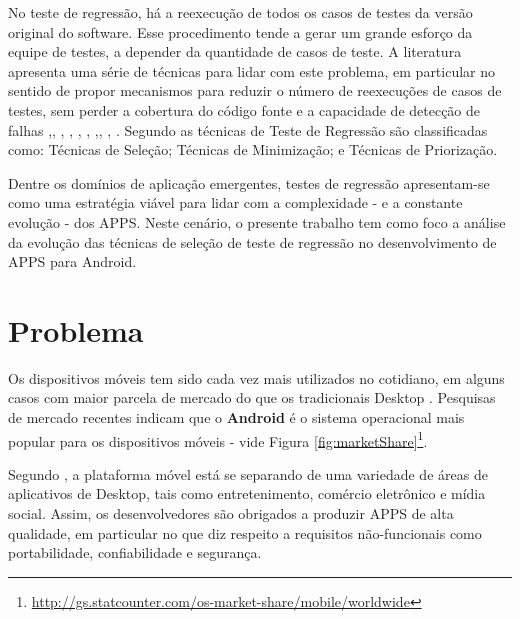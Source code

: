 No teste de regressão, há a reexecução de todos os casos de testes da versão original do software. Esse procedimento tende a gerar um grande esforço da equipe de testes, a depender da quantidade de casos de teste. A literatura apresenta uma série de técnicas para lidar com este problema, em particular no sentido de propor mecanismos para reduzir o número de reexecuções de casos de testes, sem perder a cobertura do código fonte e a capacidade de detecção de falhas ,\cite{65194}, \cite{WHITE1991}, \cite{Graves:2001:ESR:367008.367020}, \cite{630875}, \cite{536955}, \cite{ENGSTROM201014},\cite{ENGSTROM201014}, \cite{KAZMI2017}, \cite{ROMANO201862}. Segundo  as técnicas de Teste de Regressão são classificadas como: Técnicas de Seleção; Técnicas de Minimização; e Técnicas de Priorização.  

Dentre os domínios de aplicação emergentes, testes de regressão apresentam-se como uma estratégia viável para lidar com a complexidade - e a constante evolução - dos \ac{APPS}. Neste cenário, o presente trabalho tem como foco a análise da evolução das técnicas de seleção de teste de regressão no desenvolvimento de \ac{APPS} para Android.


\section{Problema}\label{sec:problema}

Os dispositivos móveis tem sido cada vez mais utilizados no cotidiano, em alguns casos com maior parcela de mercado do que os tradicionais Desktop \cite{Do2016RedroidAR}. Pesquisas de mercado recentes indicam que o \textbf{Android} é o sistema operacional mais popular para os dispositivos móveis - vide Figura \ref{fig:marketShare}\footnote{\url{http://gs.statcounter.com/os-market-share/mobile/worldwide}}. 

Segundo , a plataforma móvel está se separando de uma variedade de áreas de aplicativos de Desktop, tais como entretenimento, comércio eletrônico e mídia social. Assim, os desenvolvedores são obrigados a produzir \ac{APPS} de alta qualidade, em particular no que diz respeito a requisitos não-funcionais como portabilidade, confiabilidade e segurança.


